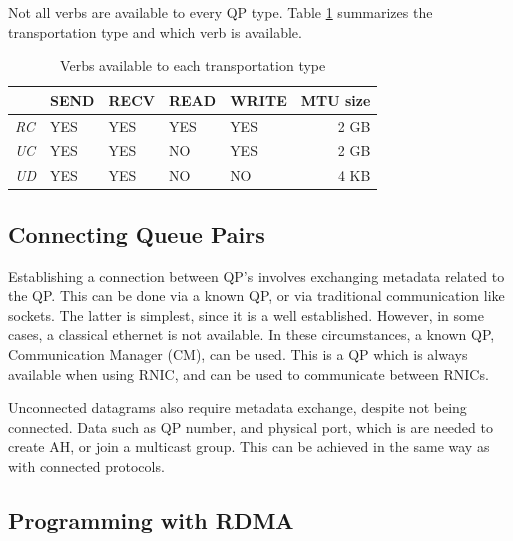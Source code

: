 Not all verbs are available to every QP type. Table \ref{tab:transport-verb} summarizes the transportation type and which verb is available.

\begin{table}
    \centering
    \begin{tabular}{lllllr}
        \toprule
          & \textbf{SEND} & \textbf{RECV} & \textbf{READ} & \textbf{WRITE} & \textbf{MTU size} \\
        \midrule
        \textit{RC} & YES & YES & YES & YES & 2 GB \\
        \textit{UC} & YES & YES & NO & YES & 2 GB \\
        \textit{UD} & YES & YES & NO & NO & 4 KB \\
        \bottomrule
    \end{tabular}
    \caption{Verbs available to each transportation type}
    \label{tab:transport-verb}
\end{table}

\subsection{Connecting Queue Pairs}\label{subsec:connecting-qp's}
Establishing a connection between QP's involves exchanging metadata related to the QP.
This can be done via a known QP, or via traditional communication like sockets.
The latter is simplest, since it is a well established.
However, in some cases, a classical ethernet is not available.
In these circumstances, a known QP, Communication Manager (CM), can be used.
This is a QP which is always available when using RNIC, and can be used to communicate between RNICs.

Unconnected datagrams also require metadata exchange, despite not being connected.
Data such as QP number, and physical port, which is are needed to create AH, or join a multicast group.
This can be achieved in the same way as with connected protocols.

\subsection{Programming with RDMA}\label{subsec:programming-with-rdma}

